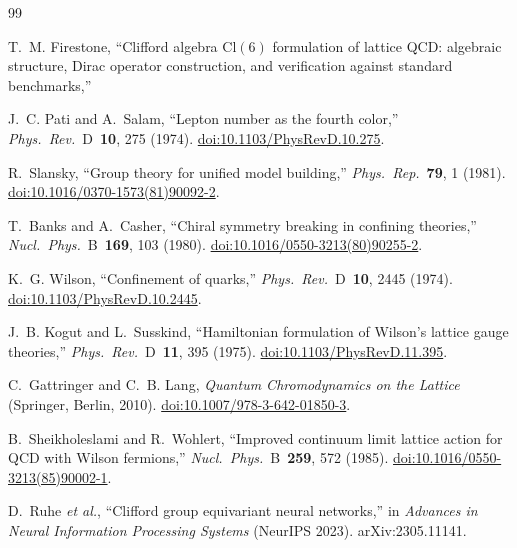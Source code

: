 \documentclass[12pt]{article}
\theoremstyle{definition}
\theoremstyle{remark}
\newcommand{\cl}{\mathrm{Cl}}           %
\begin{document}
	\begin{thebibliography}{99}
		
		T.~M. Firestone,
		``Clifford algebra $\cl(6)$ formulation of lattice QCD: algebraic structure,
		Dirac operator construction, and verification against standard benchmarks,''
		
		J.~C. Pati and A.~Salam,
		``Lepton number as the fourth color,''
		\textit{Phys.\ Rev.}\ D~\textbf{10}, 275 (1974).
		\href{https://doi.org/10.1103/PhysRevD.10.275}{doi:10.1103/PhysRevD.10.275}.
		
		R.~Slansky,
		``Group theory for unified model building,''
		\textit{Phys.\ Rep.}\ \textbf{79}, 1 (1981).
		\href{https://doi.org/10.1016/0370-1573(81)90092-2}{doi:10.1016/0370-1573(81)90092-2}.
		
		T.~Banks and A.~Casher,
		``Chiral symmetry breaking in confining theories,''
		\textit{Nucl.\ Phys.}\ B~\textbf{169}, 103 (1980).
		\href{https://doi.org/10.1016/0550-3213(80)90255-2}{doi:10.1016/0550-3213(80)90255-2}.
		
		K.~G. Wilson,
		``Confinement of quarks,''
		\textit{Phys.\ Rev.}\ D~\textbf{10}, 2445 (1974).
		\href{https://doi.org/10.1103/PhysRevD.10.2445}{doi:10.1103/PhysRevD.10.2445}.
		
		J.~B. Kogut and L.~Susskind,
		``Hamiltonian formulation of Wilson's lattice gauge theories,''
		\textit{Phys.\ Rev.}\ D~\textbf{11}, 395 (1975).
		\href{https://doi.org/10.1103/PhysRevD.11.395}{doi:10.1103/PhysRevD.11.395}.
		
		C.~Gattringer and C.~B. Lang,
		\textit{Quantum Chromodynamics on the Lattice}
		(Springer, Berlin, 2010).
		\href{https://doi.org/10.1007/978-3-642-01850-3}{doi:10.1007/978-3-642-01850-3}.
		
		B.~Sheikholeslami and R.~Wohlert,
		``Improved continuum limit lattice action for QCD with Wilson fermions,''
		\textit{Nucl.\ Phys.}\ B~\textbf{259}, 572 (1985).
		\href{https://doi.org/10.1016/0550-3213(85)90002-1}{doi:10.1016/0550-3213(85)90002-1}.
		
		D.~Ruhe \textit{et al.},
		``Clifford group equivariant neural networks,''
		in \textit{Advances in Neural Information Processing Systems} (NeurIPS 2023).
		arXiv:2305.11141.
		

\end{thebibliography}
\end{document}
